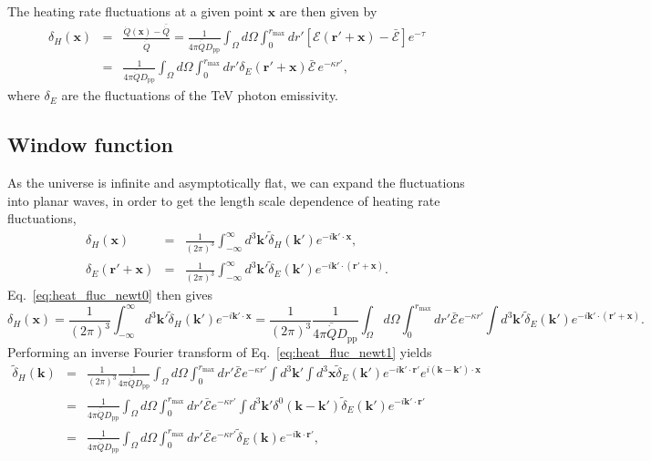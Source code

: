 \documentclass[numberedappendix]{emulateapj}
\begin{document}
The heating rate fluctuations at a given point $\mathbf{x}$ are then given by 
\begin{eqnarray}
  \label{eq:heat_fluc_newt0}
  \delta_H(\mathbf{x})&=&\frac{\dot{Q}(\mathbf{x})-\bar{\dot{Q}}}{\bar{\dot{Q}}}=
  \frac{1}{4\pi\bar{\dot{Q}}D_{\mathrm{pp}}} \int_{\Omega}d\Omega\int_0^{r_{\mathrm{max}}} dr' 
  [\mathcal{E}(\mathbf{r}'+\mathbf{x})-\bar{\mathcal{E}}]e^{-\tau} \nonumber\\
  &=&\frac{1}{4\pi\bar{\dot{Q}}D_{\mathrm{pp}}}\int_{\Omega}d\Omega\int_0^{r_{\mathrm{max}}} dr' \delta_E(\mathbf{r}'+\mathbf{x})\bar{\mathcal{E}}\,e^{-\kappa r'} ,
\end{eqnarray}
where $\delta_E$ are the fluctuations of the TeV photon emissivity.


% 

\subsection{Window function}
As the universe is infinite and asymptotically flat, we can expand the fluctuations into planar waves, in order to get the length scale dependence of heating rate fluctuations,
\begin{eqnarray}
  \label{eq:FT_delta}
  \delta_H(\mathbf{x})&=&\frac{1}{(2\pi)^3}\int_{-\infty}^{\infty} d^3\mathbf{k'} \tilde{\delta}_H(\mathbf{k'}) e^{-i\mathbf{k'}\cdot\mathbf{x}},\\ \nonumber
  \delta_E(\mathbf{r}'+\mathbf{x})&=&\frac{1}{(2\pi)^3}\int_{-\infty}^{\infty} d^3\mathbf{k'} \tilde{\delta}_E(\mathbf{k'}) e^{-i\mathbf{k'}\cdot(\mathbf{r'}+\mathbf{x})}.
\end{eqnarray}
Eq.~\eqref{eq:heat_fluc_newt0} then gives
\begin{equation}
  \label{eq:heat_fluc_newt1}
  \delta_H(\mathbf{x})
  =\frac{1}{(2\pi)^3}\int_{-\infty}^{\infty} d^3\mathbf{k'} \tilde{\delta}_H(\mathbf{k'}) e^{-i\mathbf{k'}\cdot\mathbf{x}}
  =\frac{1}{ (2\pi)^3}\frac{1}{4\pi\bar{\dot{Q}}D_{\mathrm{pp}}} \int_{\Omega}d\Omega\int_0^{r_{\mathrm{max}}}  dr' \bar{\mathcal{E}} e^{-\kappa r'} \int d^3\mathbf{k'} \tilde{\delta}_E(\mathbf{k'}) e^{-i\mathbf{k'}\cdot(\mathbf{r'}+\mathbf{x})}.
\end{equation}
Performing an inverse Fourier transform of Eq.~\eqref{eq:heat_fluc_newt1} yields
\begin{eqnarray}
  \label{eq:heat_fluc_newt2}
  \tilde{\delta}_H(\mathbf{k})&=& \frac{1}{(2\pi)^3} \frac{1}{4\pi\bar{\dot{Q}}D_{\mathrm{pp}}}\int_{\Omega}d\Omega\int_0^{r_{\mathrm{max}}} dr' \bar{ \mathcal{E}} e^{-\kappa r'} \int d^3\mathbf{k'}\int d^3\mathbf{x} \tilde{\delta}_E(\mathbf{k'})e^{-i\mathbf{k'}\cdot{\mathbf{r}'}} e^{i(\mathbf{k}-\mathbf{k'})\cdot\mathbf{x}} \\ \nonumber
  &=&\frac{1}{4\pi\bar{\dot{Q}}D_{\mathrm{pp}}} \int_{\Omega}d\Omega\int_0^{r_{\mathrm{max}}}   dr' \bar{\mathcal{E}}  e^{-\kappa r'} \int d^3\mathbf{k'} \delta^{0}(\mathbf{k}-\mathbf{k}')\tilde{\delta}_E(\mathbf{k'}) e^{-i\mathbf{k'}\cdot{\mathbf{r}'}}  \\ \nonumber
  &=&\frac{1}{4\pi\bar{\dot{Q}}D_{\mathrm{pp}}} \int_{\Omega}d\Omega\int_0^{r_{\mathrm{max}}}  dr' \bar{ \mathcal{E}} e^{-\kappa r'}  \tilde{\delta}_E(\mathbf{k}) e^{-i\mathbf{k}\cdot{\mathbf{r}'}}  ,
\end{eqnarray}
\end{document}
